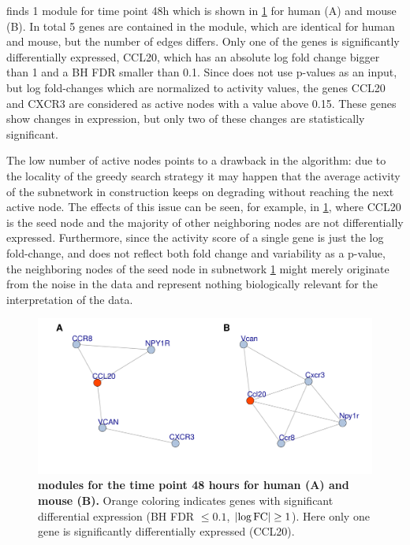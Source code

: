 \nexus{} finds 1 module for time point \unit{48}{h} which is shown in \cref{fig:nexus} for human (A) and mouse (B).
In total 5 genes are contained in the module, which are identical for human and mouse, but the number of edges differs.
Only one of the genes is significantly differentially expressed, CCL20, which has an absolute log fold change bigger than 1 and a BH FDR smaller than 0.1.
Since \nexus{} does not use p-values as an input, but log fold-changes which are normalized to activity values, the genes CCL20 and CXCR3 are considered as active nodes with a value above 0.15.
These genes show changes in expression, but only two of these changes are statistically significant.

The low number of active nodes points to a drawback in the \nexus{} algorithm: due to the locality of the greedy search strategy it may happen that the average activity of the subnetwork in construction keeps on degrading without reaching the next active node.
The effects of this issue can be seen, for example, in \cref{fig:nexus}, where CCL20 is the seed node and the majority of other neighboring nodes are not differentially expressed.
Furthermore, since the activity score of a single gene is just the log fold-change, and does not reflect both fold change and variability as a p-value, the neighboring nodes of the seed node in subnetwork \cref{fig:nexus} might merely originate from the noise in the data and represent nothing biologically relevant for the interpretation of the data.

\begin{figure}[h]
	\centering
	\includegraphics[width=\linewidth]{img/Nexus_module_A.pdf}
	\caption[\nexus{} modules for the time point 48 hours for human and mouse]{\textbf{\nexus{} modules for the time point 48 hours for human (A) and mouse (B).}
	Orange coloring indicates genes with significant differential expression (BH FDR $\leq 0.1$, $\lvert\log \mathrm{FC}\rvert \geq 1$).
	Here only one gene is significantly differentially expressed (CCL20).
	}
	\label{fig:nexus}
\end{figure}

